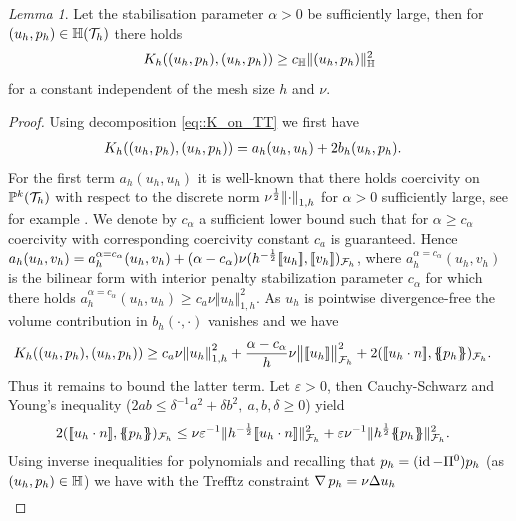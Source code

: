 \documentclass[sn-mathphys,Numbered]{sn-jnl}%
\theoremstyle{remark}%
\newtheorem{lemma}[theorem]{Lemma}
\theoremstyle{definition}%
\begin{document}
\begin{lemma}\label{lem:coercivity}
  Let the stabilisation parameter $\alpha>0$ be sufficiently large, then for $(u_h,p_h) \in \mathbb{H}({\mathcal{T}_h})$ there holds
  \begin{equation}
    K_h((u_h,p_h),(u_h,p_h)) \geq c_{\mathbb{H}} \Vert (u_h,p_h) \Vert_{\mathbb{H}}^2
  \end{equation}
  for a constant independent of the mesh size $h$ and $\nu$.
\end{lemma}
\begin{proof}
Using decomposition \eqref{eq::K_on_TT} we first have
  \begin{align*}
    K_h((u_h,p_h),(u_h,p_h)) & = a_h(u_h,u_h) + 2 b_h(u_h,p_h).
    \end{align*}
For the first term $a_h(u_h,u_h)$ it is well-known that there holds coercivity on $\mathbb{P}^k({\mathcal{T}_h})$ with respect to the discrete norm $\nu^{\frac12} \norm{\cdot}_{1,h}$ for $\alpha>0$ sufficiently large, see for example \cite{arnold2002unified,di2011mathematical}. We denote by $c_\alpha$ a sufficient lower bound such that for $\alpha\geq c_\alpha$ coercivity with corresponding coercivity constant $c_a$ is guaranteed.
Hence $a_h(u_h,v_h) = a_h^{\alpha=c_\alpha}(u_h,v_h) + (\alpha - c_\alpha) \nu (h^{-\frac12}[\![u_h]\!],[\![v_h]\!])_{{\mathcal{F}_h}}$, where $a_h^{\alpha=c_\alpha}(u_h,v_h)$ is the bilinear form with interior penalty stabilization parameter $c_\alpha$ for which there holds
$a_h^{\alpha=c_\alpha}(u_h,u_h) \geq c_a \nu \Vert u_h \Vert_{1,h}^2$.
As $u_h$ is pointwise divergence-free the volume contribution in $b_h(\cdot,\cdot)$ vanishes and we have
  \begin{align*}
    \Kh((u_h,p_h),(u_h,p_h)) & \geq c_{a} \nu \norm{u_h}_{1,h}^2 + \frac{\alpha - c_\alpha}{h} \nu \norm{\jmp{u_h}}_{\Fh}^2 + 2 (\jmp{u_h \cdot n}, \avg{p_h})_{\Fh}.
  \end{align*}
  Thus it remains to bound the latter term. Let $\varepsilon > 0$, then Cauchy-Schwarz
  and Young's inequality ($2 a b \leq \delta^{-1} a^2 + \delta
  b^2,~a,b,\delta \geq 0$) yield
  \begin{align*}
    2 (\jmp{u_h \cdot n}, \avg{p_h})_{\Fh} & \leq \nu \varepsilon^{-1} \Vert{h^{-\frac12}\jmp{u_h \cdot n}}\Vert_{\Fh}^2 + \varepsilon \nu^{-1} \nrm{h^{\frac12}\avg{p_h}}_{\Fh}^2.
  \end{align*}
  Using inverse inequalities for polynomials and recalling that $p_h = (\operatorname{id}-\Pi^0)p_h$ (as
  $(u_h,p_h)\in \mathbb{H}$) we have with the Trefftz constraint $\operatorname{\nabla} p_h = \nu
  \Delta u_h$ 
  \begin{align*}

\end{align*}
\end{proof}
\end{document}
